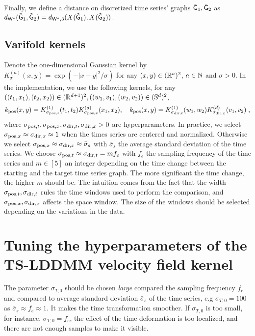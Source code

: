  Finally, we define a distance on discretized time series' graphs $\tilde{\mathsf{G}}_1,\tilde{\mathsf{G}}_2$ as $d_{\mathsf{W}^*}(\tilde{\mathsf{G}}_1,\tilde{\mathsf{G}}_2)=d_{\mathsf{W}^*,3}(X(\tilde{\mathsf{G}}_1),X(\tilde{\mathsf{G}}_2)) $.


\subsection{Varifold kernels}
\label{appendix:kernel_implementation}
Denote the one-dimensional Gaussian kernel by $K_\sigma^{(a)}(x,y)=\exp(-|x-y|^2/\sigma)$ for any $(x,y)\in (\mathbb{R}^a)^2$, $a\in \mathbb{N}$ and $\sigma>0$.
In the implementation, we use the following kernels, for any $((t_1,x_1),(t_2,x_2))\in (\mathbb{R}^{d+1})^2, ((w_1,v_1),(w_2,v_2))\in (\mathbb{S}^{d})^2 $,
\begin{equation}
  k_{\mathrm{pos}}(x,y)=K_{\sigma_{\mathrm{pos},t}}^{(1)}(t_1,t_2)K_{\sigma_{\mathrm{pos},x}}^{(d)}(x_1,x_2),\quad k_{\mathrm{pos}}(x,y)=K_{\sigma_{\mathrm{dir},t}}^{(1)}(w_1,w_2)K_{\sigma_{\mathrm{dir},x}}^{(d)}(v_1,v_2)\; ,
\end{equation}
where $\sigma_{\mathrm{pos},t}, \sigma_{\mathrm{pos},x}, \sigma_{\mathrm{dir},t}, \sigma_{\mathrm{dir},x}>0 $ are hyperparameters.
 In practice, we select $\sigma_{\mathrm{pos},x}\approx \sigma_{\mathrm{dir},x} \approx 1$ when the times series are centered and normalized. Otherwise we select $\sigma_{\mathrm{pos},x}\approx \sigma_{\mathrm{dir},x} \approx \bar{\sigma}_{s}$ with $\bar{\sigma}_{s}$ the average standard deviation of the time series.
  We choose $\sigma_{\mathrm{pos},t}\approx \sigma_{\mathrm{dir},t} = m f_e$ with $f_e$ the sampling frequency of the time series and $m\in [5]$ an integer depending on the time change between the starting and the target time series graph.
  The more significant the time change, the higher $m$ should be. The intuition comes from the fact that the width $\sigma_{\mathrm{pos},t}, \sigma_{\mathrm{dir},t}$ rules the time windows used to perform the comparison, and $\sigma_{\mathrm{pos},x}, \sigma_{\mathrm{dir},x}$ affects the space window.
   The size of the windows should be selected depending on the variations in the data.

\section{Tuning the hyperparameters of the TS-LDDMM velocity field kernel}
\label{appendix:kernel_TS_LDDMM}
The parameter $\sigma_{T,0}$ should be chosen \textit{large} compared the sampling frequency $f_e$ and compared to average standard deviation $\bar{\sigma}_s$ of the time series, e.g $\sigma_{T,0}=100$ as $\bar{\sigma}_s\approx f_e\approx  1 $.
It makes the time transformation smoother. If $\sigma_{T,0}$ is too small, for instance, $\sigma_{T,0}=f_e $, the effect of the time deformation is too localized, and there are not enough samples to make it visible.

